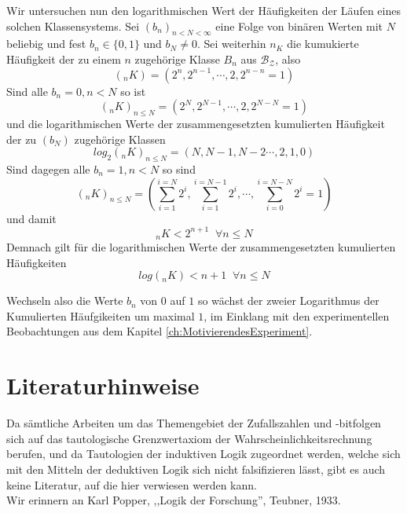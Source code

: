 \documentclass[11pt,oneside,a4paper]{scrreprt}
\begin{document}
\noindent Wir untersuchen nun den logarithmischen Wert der Häufigkeiten der Läufen eines solchen Klassensystems.
Sei $(b_n)_{n<N<\infty}$ eine Folge von binären Werten mit $N$ beliebig und fest $b_n \in \{0,1\}$ und $b_N \neq 0$. 
Sei  weiterhin $n_K$ die kumukierte Häufigkeit der zu einem $n$ zugehörige Klasse $B_n$ aus $\mathcal{B_Z}$, also 
\begin{equation}
(_nK) =\left( 2^n, 2^{n-1}, \cdots, 2, 2^{n-n}=1\right) 
\end{equation} 
Sind alle $b_n=0, n<N$ so ist
\begin{equation}
(_nK) _{n\leq N} =\left( 2^N, 2^{N-1}, \cdots, 2, 2^{N-N}=1\right) 
\end{equation}
und  die logarithmischen Werte der zusammengesetzten kumulierten Häufigkeit der zu $(b_N)$ zugehörige Klassen
\begin{equation}
log_2(_nK) _{n\leq N} =\left(N,N-1,N-2\cdots, 2,1,0\right)
\end{equation}
Sind dagegen alle $b_n=1, n<N$ so sind 
\begin{equation}
(_nK) _{n\leq N} =\left(\sum_{i=1}^{i=N} 2^{i},\sum_{i=1}^{i=N-1} 2^{i}, \cdots , \sum_{i=0}^{i=N-N} 2^{i}=1 \right)
\end{equation} 
und damit
\begin{equation}
_nK < 2^{n+1}\;\;\forall n\leq N
\end{equation}
Demnach gilt für die logarithmischen Werte der zusammengesetzten kumulierten Häufigkeiten
\begin{equation}
log(_nK) < n+1\;\;\forall n\leq N
\end{equation}

Wechseln also die Werte $b_n$ von $0$ auf $1$ so wächst der zweier Logarithmus der Kumulierten Häufgikeiten um maximal $1$, im Einklang mit den experimentellen Beobachtungen aus dem Kapitel \ref{ch:MotivierendesExperiment}.\\


\chapter{Literaturhinweise}
Da sämtliche Arbeiten um das Themengebiet der Zufallszahlen und -bitfolgen sich auf das tautologische Grenzwertaxiom der Wahrscheinlichkeitsrechnung berufen, und da Tautologien der induktiven Logik zugeordnet werden, welche sich mit den Mitteln der deduktiven Logik sich nicht falsifizieren lässt, gibt es auch keine Literatur, auf die hier verwiesen werden kann.\\
Wir erinnern an Karl Popper, ,,Logik der Forschung'', Teubner, 1933.
\end{document}
